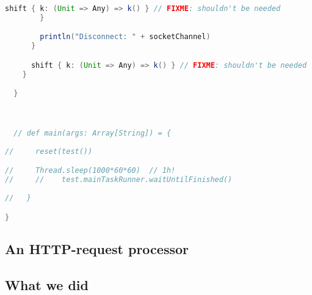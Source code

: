 \begin{lstlisting}[language=Scala]
      	  shift { k: (Unit => Any) => k() } // FIXME: shouldn't be needed
      	}

    	println("Disconnect: " + socketChannel)
      }

      shift { k: (Unit => Any) => k() } // FIXME: shouldn't be needed
    }

  }



  // def main(args: Array[String]) = {
  
//     reset(test())

//     Thread.sleep(1000*60*60)  // 1h!
//     //    test.mainTaskRunner.waitUntilFinished()
  
//   }

}
\end{lstlisting}

\subsection{An HTTP-request processor}

\subsection{What we did}